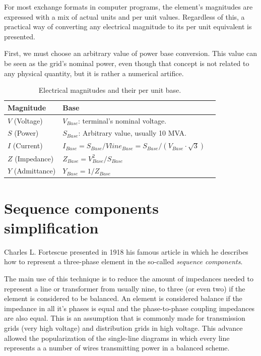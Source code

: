 \documentclass[a4paper,twoside,fleqn]{tufte-book}
\begin{document}
For most exchange formats in computer programs, the element's magnitudes are expressed with a mix of actual units and per unit values. Regardless of this, a practical way of converting any electrical magnitude to its per unit equivalent is presented.

First, we must choose an arbitrary value of power base conversion. This value can be seen as the grid's nominal power, even though that concept is not related to any physical quantity, but it is rather a numerical artifice. 





\bigskip
\begin{table}[h!]
\begin{center}
\footnotesize
\begin{tabular}{lll}
\toprule
Magnitude &  Base\\
\midrule
$V$ (Voltage) & $V_{Base}$: terminal's nominal voltage. \\
$S$ (Power) & $S_{Base}$: Arbitrary value, usually 10 MVA. \\
$I$ (Current) & $I_{Base} = S_{Base} / Vline_{Base} = S_{Base} / (V_{Base} \cdot \sqrt{3})$ \\
$Z$ (Impedance) & $Z_{Base} = V_{Base}^2 / S_{Base}$ \\
$Y$ (Admittance) & $Y_{Base} = 1 / Z_{Base}$ \\
\bottomrule
\end{tabular}
\end{center}
  \caption{Electrical magnitudes and their per unit base.}
  \label{magnitudes_and_their_base}
\end{table}


\section{Sequence components simplification}

Charles L. Fortescue presented in 1918 his famous article \cite{fortescue1918method} in which he describes how to represent a three-phase element in the so-called \textit{sequence components}.

The main use of this technique is to reduce the amount of impedances needed to represent a line or transformer from usually nine, to three (or even two) if the element is considered to be balanced. An element is considered balance if the impedance in all it's phases is equal and the phase-to-phase coupling impedances are also equal. This is an assumption that is commonly made for transmission grids (very high voltage) and distribution grids in high voltage. This advance allowed the popularization of the single-line diagrams in which every line represents a  a number of wires transmitting power in a balanced scheme.
\end{document}
